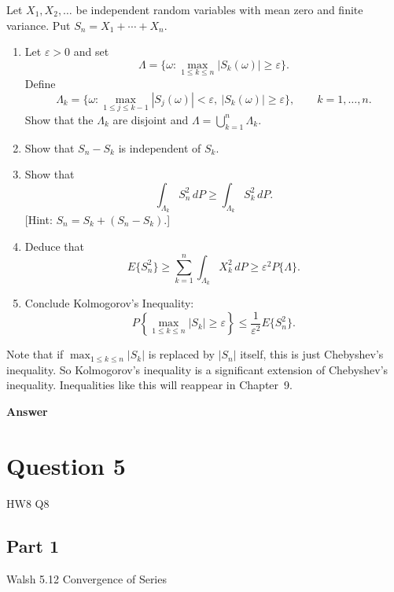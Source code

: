 \documentclass[letterpaper]{article}
\begin{document}
		Let $X_1,X_2,\ldots$ be independent random variables with mean zero and finite variance. Put $S_n=X_1+\cdots+X_n$.
		\begin{enumerate}
			\item[(a)] Let $\varepsilon>0$ and set
			\[
			\Lambda=\{\omega:\max_{1\le k\le n}|S_k(\omega)|\ge \varepsilon\}.
			\]
			Define
			\[
			\Lambda_k=\{\omega:\max_{1\le j\le k-1}|S_j(\omega)|<\varepsilon,\ |S_k(\omega)|\ge \varepsilon\},
			\qquad k=1,\ldots,n.
			\]
			Show that the $\Lambda_k$ are disjoint and $\Lambda=\bigcup_{k=1}^n \Lambda_k$.
			
			\item[(b)] Show that $S_n-S_k$ is independent of $S_k$.
			
			\item[(c)] Show that
			\[
			\int_{\Lambda_k} S_n^2\,dP \ge \int_{\Lambda_k} S_k^2\,dP.
			\]
			[Hint: $S_n=S_k+(S_n-S_k)$.]
			
			\item[(d)] Deduce that
			\[
			E\{S_n^2\}\ge \sum_{k=1}^n \int_{\Lambda_k} X_k^2\,dP
			\ge \varepsilon^2 P\{\Lambda\}.
			\]
			
			\item[(e)] Conclude {Kolmogorov's Inequality}:
			\begin{equation}
				P\left\{\max_{1\le k\le n}|S_k|\ge \varepsilon\right\}
				\le \frac{1}{\varepsilon^2} E\{S_n^2\}.
				\tag{5.4}
			\end{equation}
		\end{enumerate}
		
		Note that if $\max_{1\le k\le n}|S_k|$ is replaced by $|S_n|$ itself, this is just Chebyshev's inequality. So Kolmogorov's inequality is a significant extension of Chebyshev's inequality. Inequalities like this will reappear in Chapter~9.
		
		
		\textbf{Answer} 
		
		
		
		\clearpage
		
		\section{Question 5}
		
		{\color{deepred} HW8 Q8}
		
		\subsection{Part 1}
		{\color{deepred}  Walsh 5.12 Convergence of Series}
		
\end{document}
